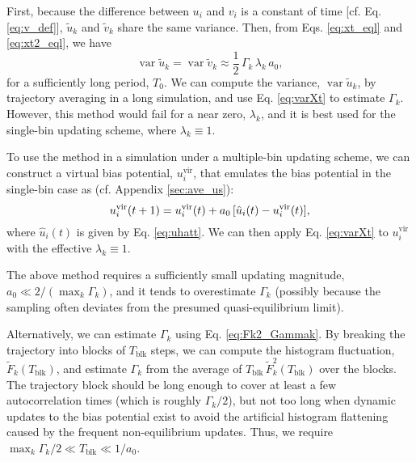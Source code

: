 \documentclass[preprint, superscriptaddress, floatfix]{revtex4-1}
\begin{document}
First, because the difference between $u_i$ and $v_i$
is a constant of time [cf. Eq. \eqref{eq:v_def}],
${\tilde u}_{k}$ and ${\tilde v}_{k}$
share the same variance.
%
%
Then, from Eqs. \eqref{eq:xt_eql} and \eqref{eq:xt2_eql}, we have
%
\begin{equation}
  \operatorname{var} {\tilde u}_k
  =
  \operatorname{var} {\tilde v}_{k}
  \approx
  \frac{1}{2} \, \Gamma_k \, \lambda_k \, a_0
  ,
\label{eq:varXt}
\end{equation}
%
for a sufficiently long period, $T_0$.
%
We can compute the variance, $\operatorname{var} \tilde u_k$,
by trajectory averaging in a long simulation,
and use Eq. \eqref{eq:varXt} to estimate $\Gamma_k$.
%
However, this method would fail for a near zero, $\lambda_k$,
and it is best used for the single-bin updating scheme,
where $\lambda_k \equiv 1$.

To use the method in a simulation under a multiple-bin updating scheme,
we can construct a virtual bias potential, $u_i^\mathrm{vir}$,
that emulates the bias potential in the single-bin case
as (cf. Appendix \ref{sec:ave_us}):
%
\begin{equation}
  u_i^\mathrm{vir}(t+1)
  =
  u_i^\mathrm{vir}(t)
  +
  a_0 \, [\hat u_i(t) - u_i^\mathrm{vir}(t)]
  ,
  \notag
\end{equation}
%
where $\hat u_i(t)$ is given by Eq. \eqref{eq:uhatt}.
%
We can then apply Eq. \eqref{eq:varXt} to $u_i^\mathrm{vir}$
with the effective $\lambda_k \equiv 1$.

The above method requires a sufficiently small updating magnitude,
$a_0 \ll 2/\left(\max_k \Gamma_k \right)$,
and it tends to overestimate $\Gamma_k$
(possibly because the sampling often
deviates from the presumed quasi-equilibrium limit).


Alternatively, we can estimate $\Gamma_k$ using Eq. \eqref{eq:Fk2_Gammak}.
%
By breaking the trajectory into blocks of $T_\mathrm{blk}$ steps,
we can compute the histogram fluctuation, $\tilde F_k(T_\mathrm{blk})$,
and estimate $\Gamma_k$ from the average of
$T_\mathrm{blk} \, \tilde F_k^2(T_\mathrm{blk})$
over the blocks.
%
The trajectory block should be long enough
to cover at least a few autocorrelation times (which is roughly $\Gamma_k/2$),
but not too long
when dynamic updates to the bias potential exist
to avoid the artificial histogram flattening
caused by the frequent non-equilibrium updates.
%
Thus, we require $\max_k \Gamma_k/2 \ll T_\mathrm{blk} \ll 1/a_0$.
\end{document}
